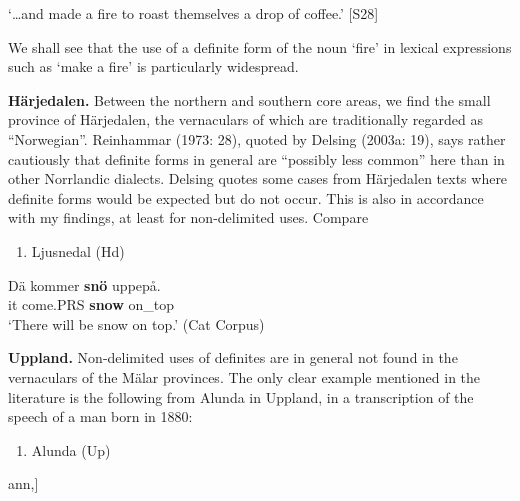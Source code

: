 ‘…and made a fire to roast themselves a drop of coffee.’ [S28]
\z

We shall see that the use of a definite form of the noun ‘fire’ in lexical expressions such as ‘make a fire’ is particularly widespread.

\textbf{Härjedalen.} Between the northern and southern core areas, we find the small province of Härjedalen, the vernaculars of which are traditionally regarded as “Norwegian”. Reinhammar (1973: 28), quoted by Delsing (2003a: 19), says rather cautiously that definite forms in general are “possibly less common” here than in other Norrlandic dialects. Delsing quotes some cases from Härjedalen texts where definite forms would be expected but do not occur. This is also in accordance with my findings, at least for non-delimited uses. Compare

\begin{enumerate} %
\item 
Ljusnedal (Hd)

\end{enumerate} %
\ea\label{}
\gll Dä  kommer  \textbf{snö} uppepå.\\


it  come.PRS  \textbf{snow} on\_top\\ %


‘There will be snow on top.’ (Cat Corpus)
\z


\textbf{Uppland. }Non-delimited uses of definites are in general not found in the vernaculars of the Mälar provinces. The only clear example mentioned in the literature is the following from Alunda in Uppland, in a transcription of the speech of a man born in 1880:

\begin{enumerate} %
\item 
\label{bkm:Ref154222780}Alunda (Up)

\end{enumerate} %
\ea\label{}
\gll [Ann(â)rs sô brênde-råm åpp rörn ib[29F?]ann,] \\


